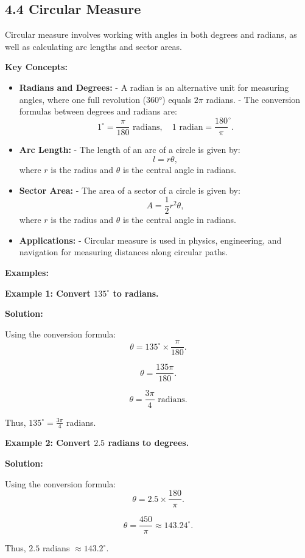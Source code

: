 
\subsection*{4.4 Circular Measure}
Circular measure involves working with angles in both degrees and radians, as well as calculating arc lengths and sector areas.

\textbf{Key Concepts:}

\begin{itemize}
	\item \textbf{Radians and Degrees:} 
	- A radian is an alternative unit for measuring angles, where one full revolution (360°) equals $2\pi$ radians.
	- The conversion formulas between degrees and radians are:
	\[
	1^\circ = \frac{\pi}{180} \text{ radians}, \quad 1 \text{ radian} = \frac{180}{\pi}^\circ.
	\]
	
	\item \textbf{Arc Length:} 
	- The length of an arc of a circle is given by:
	\[
	l = r\theta,
	\]
	where $r$ is the radius and $\theta$ is the central angle in radians.
	
	\item \textbf{Sector Area:}
	- The area of a sector of a circle is given by:
	\[
	A = \frac{1}{2} r^2 \theta,
	\]
	where $r$ is the radius and $\theta$ is the central angle in radians.
	
	\item \textbf{Applications:} 
	- Circular measure is used in physics, engineering, and navigation for measuring distances along circular paths.
\end{itemize}

\textbf{Examples:}

\begin{flushleft}
	\textbf{Example 1: Convert $135^\circ$ to radians.}
	
	\vspace{0.5cm}
	\textbf{Solution:}
	\vspace{0.5cm}
	
	Using the conversion formula:
	\[
	\theta = 135^\circ \times \frac{\pi}{180}.
	\]
	
	\[
	\theta = \frac{135\pi}{180}.
	\]
	
	\[
	\theta = \frac{3\pi}{4} \text{ radians}.
	\]
	
	Thus, $135^\circ = \frac{3\pi}{4}$ radians.
\end{flushleft}

\begin{flushleft}
	\textbf{Example 2: Convert $2.5$ radians to degrees.}
	
	\vspace{0.5cm}
	\textbf{Solution:}
	\vspace{0.5cm}
	
	Using the conversion formula:
	\[
	\theta = 2.5 \times \frac{180}{\pi}.
	\]
	
	\[
	\theta = \frac{450}{\pi} \approx 143.24^\circ.
	\]
	
	Thus, $2.5$ radians $\approx 143.2^\circ$.
\end{flushleft}

